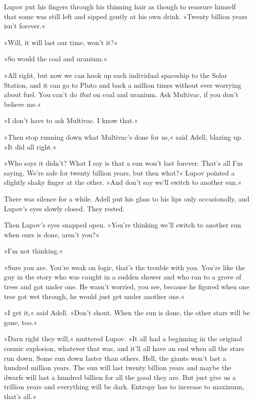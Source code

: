 \documentclass[11pt,twocolumn,paper=a5,pagesize,twoside]{scrartcl}
\newcommand{\q}[1]{»#1«}
\begin{document}
Lupov put his fingers through his thinning hair as though to reassure 
himself that some was still left and sipped gently at his own drink. 
\q{Twenty billion years isn't forever.}

\q{Will, it will last our time, won't it?}

\q{So would the coal and uranium.}

\q{All right, but now we can hook up each individual spaceship to the Solar
Station, and it can go to Pluto and back a million times without ever 
worrying about fuel. You can't do \textit{that} on coal and uranium. Ask 
Multivac, if you don't believe me.}

\q{I don't have to ask Multivac. I know that.}

\q{Then stop running down what Multivac's done for us,} said Adell, blazing 
up. \q{It did all right.}

\q{Who says it didn't? What I say is that a sun won't last forever. That's 
all I'm saying. We're safe for twenty billion years, but then what?} Lupov 
pointed a slightly shaky finger at the other. \q{And don't say we'll switch 
to another sun.}

There was silence for a while. Adell put his glass to his lips only 
occasionally, and Lupov's eyes slowly closed. They rested.

Then Lupov's eyes snapped open. \q{You're thinking we'll switch to another 
sun when ours is done, aren't you?}

\q{I'm not thinking.}

\q{Sure you are. You're weak on logic, that's the trouble with you. You're 
like the guy in the story who was caught in a sudden shower and who ran to 
a grove of trees and got under one. He wasn't worried, you see, because he 
figured when one tree got wet through, he would just get under another one.}

\q{I get it,} said Adell. \q{Don't shout. When the sun is done, the other 
stars will be gone, too.}

\q{Darn right they will,} muttered Lupov. \q{It all had a beginning in the 
original cosmic explosion, whatever that was, and it'll all have an end when 
all the stars run down. Some run down faster than others. Hell, the giants 
won't last a hundred million years. The sun will last twenty billion years 
and maybe the dwarfs will last a hundred billion for all the good they are. 
But just give us a trillion years and everything will be dark. Entropy has 
to increase to maximum, that's all.}
\end{document}
